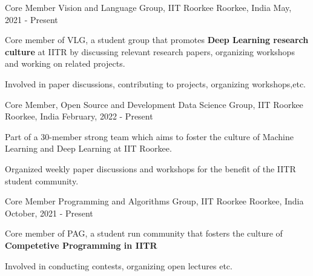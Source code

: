 

\begin{cventries}

\cventry
{Core Member} %
{Vision and Language Group, IIT Roorkee} %
{Roorkee, India} %
{May, 2021 - Present} %
{
  \begin{cvitems} %
    \item Core member of VLG, a student group that promotes \textbf{Deep Learning research culture} at IITR by discussing relevant research papers, organizing workshops and working on related projects.
    \item Involved in paper discussions, contributing to projects, organizing workshops,etc.
  \end{cvitems}
}


\cventry
{Core Member, Open Source and Development} %
{Data Science Group, IIT Roorkee} %
{Roorkee, India} %
{February, 2022 - Present} %
{
	\begin{cvitems} %
		\item Part of a 30-member strong team which aims to foster the culture of Machine Learning and Deep Learning at IIT Roorkee.
		\item Organized weekly paper discussions and workshops for the benefit of the IITR student community.
	\end{cvitems}
}



\cventry
{Core Member} %
{Programming and Algorithms Group, IIT Roorkee} %
{Roorkee, India} %
{October, 2021 - Present} %
{
	\begin{cvitems} %
		\item {Core member of PAG, a student run community that fosters the culture of \textbf{Competetive Programming in IITR}}
		\item {Involved in conducting contests, organizing open lectures etc.}
	\end{cvitems}
}


\end{cventries}
